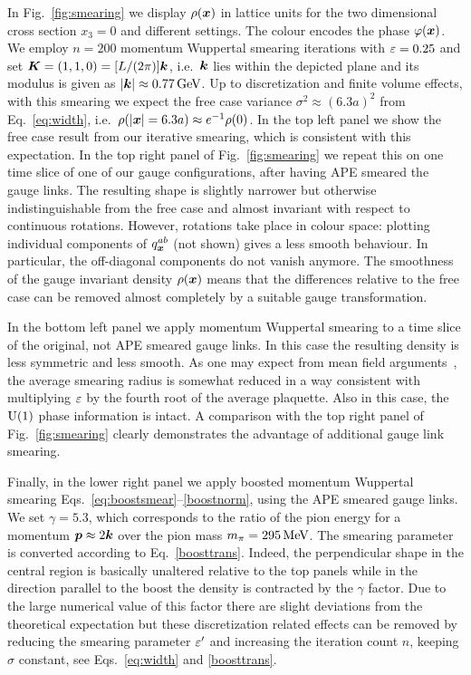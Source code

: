 In Fig.~\ref{fig:smearing} we display $\rho(\boldsymbol{x})$ in
lattice units for the two dimensional cross section $x_3=0$ and
different settings. The colour encodes the phase $\varphi(\boldsymbol{x})$.
We
employ $n=200$ momentum Wuppertal smearing iterations with
$\varepsilon=0.25$ and set $\boldsymbol{K}=(1,1,0)=[L/(2\pi)]\boldsymbol{k}$,
i.e.\ $\boldsymbol{k}$ lies within the depicted plane and its modulus
is given as $|\boldsymbol{k}|\approx 0.77\,\textmd{GeV}$. Up to discretization and
finite volume effects, with this smearing we expect the free
case variance $\sigma^2\approx (6.3a)^2$ from Eq.~\eqref{eq:width}, i.e.\
$\rho(|\boldsymbol{x}|=6.3a)\approx e^{-1}\rho(0)$. 
In the top left panel we show the free case result from our iterative
smearing, which is consistent with this expectation. In the top right
panel of Fig.~\ref{fig:smearing} we repeat this on one time slice
of one of our gauge configurations, after having APE smeared
the gauge links. The resulting shape is slightly narrower but
otherwise indistinguishable from the free case and almost invariant
with respect to continuous
rotations. However, rotations take
place in colour space: plotting individual components of
$q^{ab}_{\boldsymbol{x}}$ (not shown) gives a less smooth behaviour. In
particular, the off-diagonal components do not vanish anymore.
The smoothness of the gauge invariant density $\rho(\boldsymbol{x})$
means that the differences relative to the free case
can be removed almost completely by a suitable gauge transformation.

In the
bottom left panel we apply momentum Wuppertal smearing to a time slice of the
original, not APE smeared gauge links. In this case the resulting
density is less symmetric and less smooth.  As one
may expect from mean field
arguments~\cite{Parisi:1980pe}, the average
smearing radius is somewhat reduced in a way consistent with multiplying
$\varepsilon$ by the fourth root of the average plaquette. Also in
this case, the $\textmd{U}(1)$ phase information
is intact. A comparison with
the top right panel of Fig.~\ref{fig:smearing}
clearly demonstrates the advantage of additional gauge link
smearing.

Finally, 
in the lower right panel we apply boosted momentum Wuppertal
smearing Eqs.~\eqref{eq:boostsmear}--\eqref{boostnorm},
using the APE smeared gauge links. We set
$\gamma=5.3$, which corresponds to the ratio
of the pion energy for a momentum
$\boldsymbol{p}\approx 2\boldsymbol{k}$ over the pion mass $m_{\pi}=295\,\textmd{MeV}$.
The smearing parameter is converted
according to Eq.~\eqref{boosttrans}. Indeed, the perpendicular shape
in the central region is basically unaltered relative to the top panels
while in the direction parallel to the boost the density
is contracted by the $\gamma$ factor. Due to the large
numerical value of this factor there are slight deviations from
the theoretical expectation but
these discretization related effects can be removed by reducing the
smearing parameter $\varepsilon'$ and increasing the iteration count $n$,
keeping $\sigma$ constant, see
Eqs.~\eqref{eq:width} and \eqref{boosttrans}.

